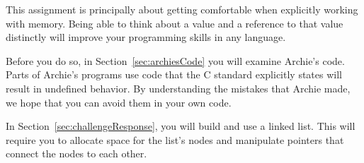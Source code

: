 This assignment is principally about getting comfortable when explicitly working with memory.
Being able to think about a value and a reference to that value distinctly will improve your programming skills in any language.

Before you do so, in Section~\ref{sec:archiesCode} you will examine Archie's code.
Parts of Archie's programs use code that the C standard explicitly states will result in undefined behavior.
By understanding the mistakes that Archie made, we hope that you can avoid them in your own code.

In Section~\ref{sec:challengeResponse}, you will build and use a linked list.
This will require you to allocate space for the list's nodes and manipulate pointers that connect the nodes to each other.
